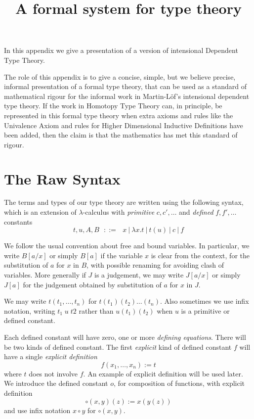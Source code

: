 \documentclass[10pt,a4paper]{article}
\begin{document}
\title{A formal system for type theory}

\author{}
\date{}
\maketitle
\title{}


In this appendix we give a presentation of a version of intensional
Dependent Type Theory. 

The role of this appendix is to give a concise, simple, but we believe
precise, informal presentation of a formal type theory, that can be
used as a standard of mathematical rigour for the informal work in
Martin-L\"{o}f's intensional dependent type theory.  If the work in
Homotopy Type Theory can, in principle, be represented in this formal
type theory when extra axioms and rules like the Univalence Axiom and
rules for Higher Dimensional Inductive Definitions have been added,
then the claim is that the mathematics has met this standard of
rigour.

\section*{The Raw Syntax}
 The terms and types of our type theory are written using the following syntax, which is an extension
of $\lambda$-calculus with {\em primitive} $c,c',\dots$ and {\em defined} $f,f',\dots$
constants
$$
t,u,A,B~~~::=~~~x~|~\lambda x.t~|~t(u)~|~c~|~f
$$

 We follow the usual convention about free and bound variables. In particular,
we write $B[a/x]$ or simply $B[a]$ if the variable $x$ is clear from the context, for the 
substitution of $a$ for $x$ in $B$, with possible renaming for avoiding clash of variables.
More generally if $J$ is a judgement, we may write $J[a/x]$ or simply $J[a]$ for the 
judgement obtained by substitution of $a$ for $x$ in $J$.

\medskip

 We may write $t(t_1,\dots,t_n)$ for $t(t_1)(t_2)\dots (t_n)$.  Also sometimes we use infix notation, writing $t_1\; u\; t2$ rather than $u(t_1)(t_2)$ when $u$ is a primitive or defined constant.

\medskip

 Each defined constant will have zero, one or more {\em defining equations}.  There will be two kinds of defined constant.  The first {\em explicit} kind of defined constant $f$ will have a single {\em explicit definition}
  \[ f(x_1,\dots,x_n):= t\]
where $t$ does not involve $f$.  An example of explicit definition will be used later.  We introduce the defined constant 
$o$, for composition of functions, with explicit definition
  \[ \circ (x,y)(z) := x(y(z))\]
and use infix notation $x\circ y$ for $\circ(x,y)$.
\end{document}
